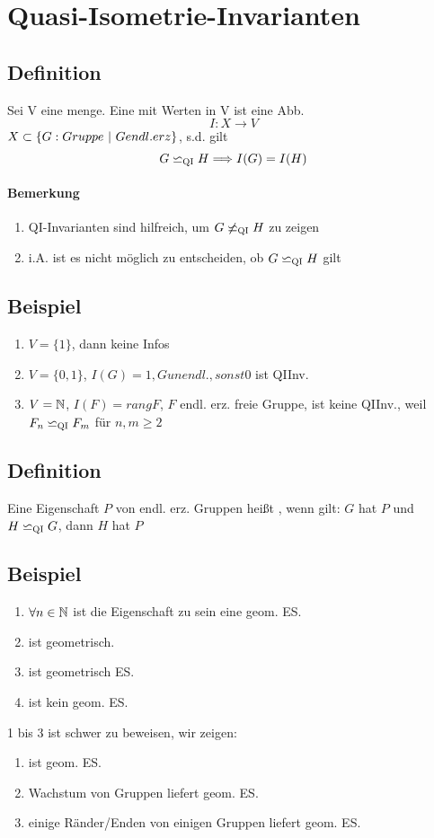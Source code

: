 \documentclass{article}
\newcommand{\qi}{\backsimeq_{\textsc{QI}}}
\begin{document}
\newpage
\section{Quasi-Isometrie-Invarianten}
\subsection{Definition}
Sei V eine menge. Eine  mit Werten in V ist eine Abb.
\[I:X \longrightarrow V\]
$X \subset \set{G: Gruppe}{G endl. erz}$, s.d. gilt
\[G\qi H \Longrightarrow I(G) = I(H)\]
\paragraph{Bemerkung}
\begin{enumerate}
	\item QI-Invarianten sind hilfreich, um $G \not\qi H $ zu zeigen
	\item i.A. ist es nicht möglich zu entscheiden, ob $G \qi H$ gilt
\end{enumerate}
\subsection{Beispiel}
\begin{enumerate}
	\item $V = \{1\}$, dann keine Infos
	\item $V = \{0,1\}$, $I(G) = 1, G unendl., sonst 0$ ist QIInv.
	\item $V = \mathbb{N}$, $I(F) = rang F$, $F$ endl. erz. freie Gruppe, ist keine QIInv., weil $F_n\qi F_m$ für $n,m \geq 2$
\end{enumerate}
\subsection{Definition}
Eine Eigenschaft $P$ von endl. erz. Gruppen heißt , wenn gilt: 
$G$ hat $P$ und $H\qi G$, dann $H$ hat $P$

\subsection{Beispiel}
\begin{enumerate}
	\item $\forall n \in \mathbb{N}$ ist die Eigenschaft  zu sein eine geom. ES.
	\item {} ist geometrisch.
	\item {} ist geometrisch ES.
	\item {} ist kein geom. ES.
\end{enumerate}
1 bis 3 ist schwer zu beweisen, wir zeigen:
\begin{enumerate}
	\item {} ist geom. ES.
	\item Wachstum von Gruppen liefert geom. ES.
	\item einige Ränder/Enden von einigen Gruppen liefert geom. ES.
\end{enumerate}
\end{document}

